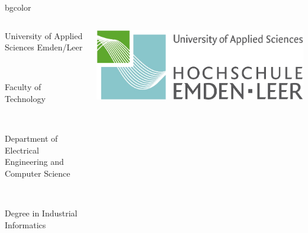 {%
\begin{beamercolorbox}[rounded=true, center]{bgcolor}
\begin{columns}[T]
\begin{column}{9cm}
{\color{gray}\begin{tiny}University of Applied Sciences Emden/Leer\end{tiny}} \\ 
{\color{gray}\begin{tiny}Faculty of Technology\end{tiny}} \\ 
{\color{gray}\begin{tiny}Department of Electrical Engineering and Computer Science\end{tiny}} \\
{\color{gray}\begin{tiny}Degree in Industrial Informatics\end{tiny}}
\end{column}
\begin{column}{2cm}
\includegraphics[scale=0.25]{img/technik.jpg}
\end{column}
\end{columns}
\end{beamercolorbox}
 }
\insertsectionhead
\insertsubsectionhead
{}
\usebackgroundtemplate
{%
      \rule{0pt}{\paperheight}%
      \hspace*{\paperwidth}%
 }

